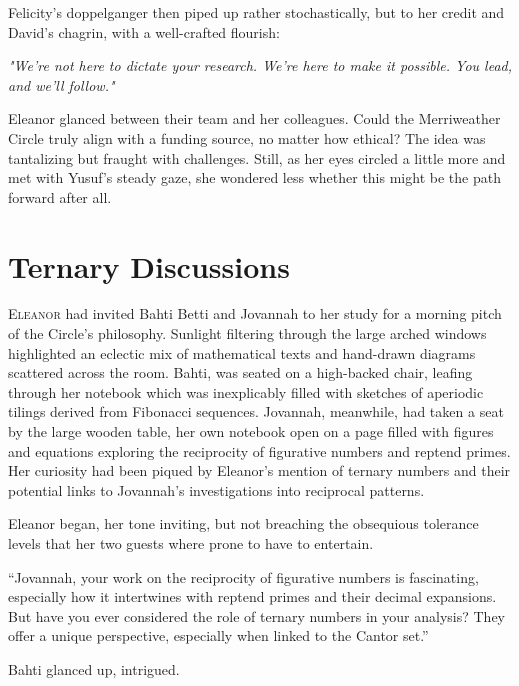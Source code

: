 \smallskip

Felicity's doppelganger then piped up rather stochastically, but to her credit and David's chagrin, with a well-crafted flourish:

\textit{"We’re not here to dictate your research. We’re here to make it possible. You lead, and we’ll follow."}

\smallskip

\noindent Eleanor glanced between their team and her colleagues.  Could the Merriweather Circle truly align with a funding source, no matter how ethical? The idea was tantalizing but fraught with challenges. Still, as her eyes circled a little more and met with Yusuf’s steady gaze, she wondered less whether this might be the path forward after all.
\newpage

\section*{Ternary Discussions}

\lettrine{E}{leanor} had invited Bahti Betti and Jovannah to her study for a morning pitch of the Circle's philosophy. Sunlight filtering through the large arched windows highlighted an eclectic mix of mathematical texts and hand-drawn diagrams scattered across the room.  Bahti, was seated on a high-backed chair, leafing through her notebook which was inexplicably filled with sketches of aperiodic tilings derived from Fibonacci sequences. Jovannah, meanwhile, had taken a seat by the large wooden table, her own notebook open on a page filled with figures and equations exploring the reciprocity of figurative numbers and reptend primes. Her curiosity had been piqued by Eleanor’s mention of ternary numbers and their potential links to Jovannah’s investigations into reciprocal patterns.

\smallskip

Eleanor began, her tone inviting, but not breaching the obsequious tolerance levels that her two guests where prone to have to entertain. 

“Jovannah, your work on the reciprocity of figurative numbers is fascinating, especially how it intertwines with reptend primes and their decimal expansions. But have you ever considered the role of ternary numbers in your analysis? They offer a unique perspective, especially when linked to the Cantor set.”

\smallskip

Bahti glanced up, intrigued. 

